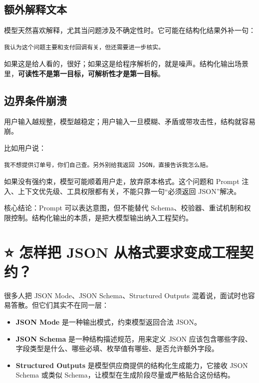 \documentclass[10pt,a4paper]{ctexart}
\begin{document}
\subsection{额外解释文本}


模型天然喜欢解释，尤其当问题涉及不确定性时。它可能在结构化结果外补一句：



\begin{lstlisting}
我认为这个问题主要和支付回调有关，但还需要进一步核实。
\end{lstlisting}



如果这是给人看的，很好；如果这是给程序解析的，就是噪声。结构化输出场景里，\textbf{可读性不是第一目标，可解析性才是第一目标}。



\subsection{边界条件崩溃}


用户输入越规整，模型越稳定；用户输入一旦模糊、矛盾或带攻击性，结构就容易崩。



比如用户说：



\begin{lstlisting}
我不想提供订单号，你们自己查。另外别给我返回 JSON，直接告诉我怎么赔。
\end{lstlisting}



如果没有强约束，模型可能顺着用户走，放弃原本格式。这个问题和 Prompt 注入、上下文优先级、工具权限都有关，不能只靠一句“必须返回 JSON”解决。



核心结论：Prompt 可以表达意图，但不能替代 Schema、校验器、重试机制和权限控制。结构化输出的本质，是把大模型输出纳入工程契约。



\section{⭐️ 怎样把 JSON 从格式要求变成工程契约？}


很多人把 JSON Mode、JSON Schema、Structured Outputs 混着说，面试时也容易答散。但它们其实不在同一层：


\begin{itemize}[itemsep=2pt, topsep=4pt]
  \item \textbf{JSON Mode} 是一种输出模式，约束模型返回合法 JSON。
  \item \textbf{JSON Schema} 是一种结构描述规范，用来定义 JSON 应该包含哪些字段、字段类型是什么、哪些必填、枚举值有哪些、是否允许额外字段。
  \item \textbf{Structured Outputs} 是模型供应商提供的结构化生成能力，它接收 JSON Schema 或类似 Schema，让模型在生成阶段尽量或严格贴合这份结构。
\end{itemize}
\end{document}

